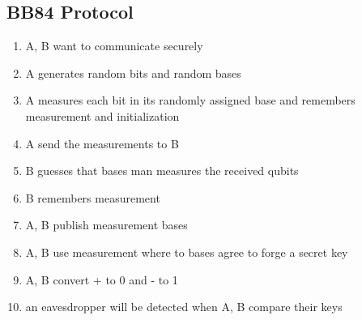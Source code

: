 \documentclass[12pt,a4paper]{article}
\begin{document}
\subsection{BB84 Protocol}
\begin{enumerate}
\item A, B want to communicate securely
\item A generates random bits and random bases
\item A measures each bit in its randomly assigned base and remembers measurement and initialization
\item A send the measurements to B
\item B guesses that bases man measures the received qubits 
\item B remembers measurement
\item A, B publish measurement bases
\item A, B use measurement where to bases agree to forge a secret key
\item A, B convert + to 0 and - to 1
\item an eavesdropper will be detected when A, B compare their keys
\end{enumerate}
\end{document}
